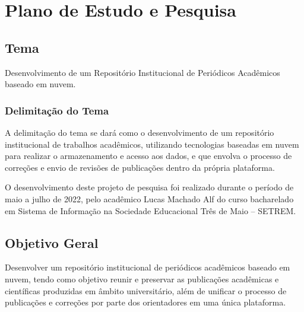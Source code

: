 \chapter{Plano de Estudo e Pesquisa} \label{chap:ResearchPlan}




\section{Tema} \label{sec::Theme}
Desenvolvimento de um Repositório Institucional de Periódicos Acadêmicos
baseado em nuvem.

\subsection{Delimitação do Tema} \label{subsec::ThemeDelimitation}

A delimitação do tema se dará como o desenvolvimento de um
repositório institucional de trabalhos acadêmicos, utilizando tecnologias
baseadas em nuvem para realizar o armazenamento e acesso aos dados,
e que envolva o processo de correções e envio de revisões de
publicações dentro da própria plataforma.

O desenvolvimento deste projeto de pesquisa foi realizado durante o período de
maio a julho de 2022, pelo acadêmico Lucas Machado Alf do curso bacharelado
em Sistema de Informação na Sociedade Educacional Três de Maio – SETREM.

\section{Objetivo Geral} \label{sec:objective}

Desenvolver um repositório institucional de periódicos acadêmicos
baseado em nuvem, tendo como objetivo reunir e preservar
as publicações acadêmicas e científicas produzidas em âmbito universitário,
além de unificar o processo de publicações e correções por parte dos orientadores
em uma única plataforma.

